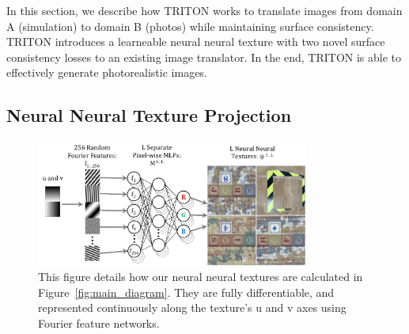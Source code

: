 \documentclass{article}
\begin{document}
		In this section, we describe how TRITON works to translate images from domain A (simulation) to domain B (photos) while maintaining surface consistency. 
		TRITON introduces a learneable neural neural texture with two novel surface consistency losses to an existing image translator. In the end, TRITON is able to effectively generate photorealistic images.
\vspace{-3pt}
	\subsection{Neural Neural Texture Projection}
	\label{sec:neural_tex}
	\vspace{-3pt}
		\begin{figure}[t]
		    \vspace{-5pt}
			\begin{center}
				\includegraphics[width=0.8\textwidth]{../images/learnable_textures.pdf}
			\end{center}
			\vspace{-3pt}
			\caption{
				This figure details how our neural neural textures are calculated in Figure~\ref{fig:main_diagram}. They are fully differentiable, and represented continuously along the texture's u and v axes using Fourier feature networks.
			}
			\vspace{-3pt}
			\label{fig:learnable_textures}
		\end{figure}
\end{document}
